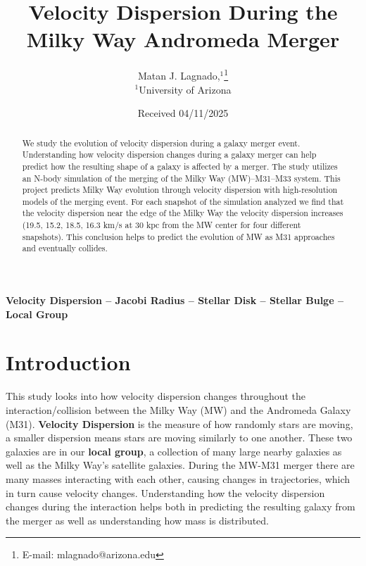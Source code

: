 \documentclass[fleqn,usenatbib]{mnras}
\title[Velocity Dispersion During the Milky Way Andromeda Merger]{Velocity Dispersion During the Milky Way Andromeda Merger}
\author[M. J. Lagnado et al.]{
Matan J. Lagnado,$^{1}$\thanks{E-mail: mlagnado@arizona.edu}
\\
$^{1}$University of Arizona\\
}
\date{Received 04/11/2025}
\begin{document}
\label{firstpage}
\pagerange{\pageref{firstpage}--\pageref{lastpage}}
\maketitle
\begin{abstract}
    We study the evolution of velocity dispersion during a galaxy merger event. Understanding how velocity dispersion changes during a galaxy merger can help predict how the resulting shape of a galaxy is affected by a merger. The study utilizes an N-body simulation of the merging of the Milky Way (MW)–M31–M33 system. This project predicts Milky Way evolution through velocity dispersion with high-resolution models of the merging event. For each snapshot of the simulation analyzed we find that the velocity dispersion near the edge of the Milky Way the velocity dispersion increases (19.5, 15.2, 18.5, 16.3 km/s at 30 kpc from the MW center for four different snapshots). This conclusion helps to predict the evolution of MW as M31 approaches and eventually collides.
\end{abstract}

\begin{keywords}
\textbf{Velocity Dispersion -- Jacobi Radius -- Stellar Disk -- Stellar Bulge -- Local Group}
\end{keywords}



\section{Introduction}

This study looks into how velocity dispersion changes throughout the interaction/collision between the Milky Way (MW) and the Andromeda Galaxy (M31). \textbf{Velocity Dispersion} is the measure of how randomly stars are moving, a smaller dispersion means stars are moving similarly to one another. These two galaxies are in our \textbf{local group}, a collection of many large nearby galaxies as well as the Milky Way's satellite galaxies. During the MW-M31 merger there are many masses interacting with each other, causing changes in trajectories, which in turn cause velocity changes. Understanding how the velocity dispersion changes during the interaction helps both in predicting the resulting galaxy from the merger as well as understanding how mass is distributed.
\end{document}
